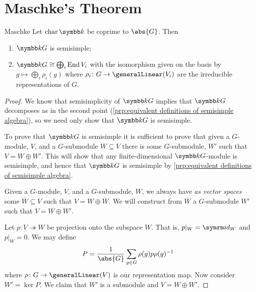 \section{Maschke's Theorem}
\begin{thm}{Maschke}{}
    Let \(\Char \field\) be coprime to \(\abs{G}\).
    Then
    \begin{enumerate}
        \item \(\field G\) is semisimple;
        \item \(\field G \isomorphic \bigoplus_i \End V_i\) with the isomorphism given on the basis by \(g \mapsto \bigoplus_i \rho_i(g)\) where \(\rho_i \colon G \to \generalLinear(V_i)\) are the irreducible representations of \(G\).
    \end{enumerate}
    \begin{proof}
        We know that semisimplicity of \(\field G\) implies that \(\field G\) decomposes as in the second point (\cref{prp:equivalent definitions of semisimple algebra}), so we need only show that \(\field G\) is semisimple.
        
        To prove that \(\field G\) is semisimple it is sufficient to prove that given a \(G\)-module, \(V\), and a \(G\)-submodule \(W \subseteq V\) there is some \(G\)-submodule, \(W'\) such that \(V = W \oplus W'\).
        This will show that any finite-dimensional \(\field G\)-module is semisimple, and hence that \(\field G\) is semisimple by \cref{prp:equivalent definitions of semisimple algebra}.
        
        Given a \(G\)-module, \(V\), and a \(G\)-submodule, \(W\), we always have \emph{as vector spaces} some \(\overbar{W} \subseteq V\) such that \(V = W \oplus \overbar{W}\).
        We will construct from \(\overbar{W}\) a \(G\)-submodule \(W'\) such that \(V = W \oplus W'\).
        
        Let \(p \colon V \twoheadrightarrow W\) be projection onto the subspace \(W\).
        That is, \(p|_W = \id_W\) and \(p|_{\overbar{W}} = 0\).
        We may define
        \begin{equation}
            P = \frac{1}{\abs{G}} \sum_{g \in G} \rho(g) p \rho(g)^{-1}
        \end{equation}
        where \(\rho \colon G \to \generalLinear(V)\) is our representation map.
        Now consider \(W' = \ker P\).
        We claim that \(W'\) is a submodule and \(V = W \oplus W'\).
        

\end{proof}
\end{thm}
